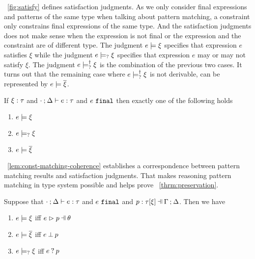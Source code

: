 \documentclass[runningheads,envcountsame,a4paper]{llncs}
\begin{document}


\figurename~\ref{fig:satisfy} defines satisfaction judgments. As we only
consider final expressions and patterns of the same type when talking about
pattern matching, a constraint only constrains final expressions of the same
type. And the satisfaction judgments does not make sense when the expression is
not final or the expression and the constraint are of different type. The
judgment $e \models \xi$ specifies that expression $e$ satisfies $\xi$ while
the judgment $e \models_{?} \xi$ specifies that expression $e$ may or may not
satisfy $\xi$. The judgment $e \models_{?}^{\dag} \xi$ is the combination of the
previous two cases. It turns out that the remaining case where
$e \models_{?}^{\dag} \xi$ is not derivable, can be represented by
$e \models \overline{\xi}$.

\begin{theorem}
  \label{thrm:exclusive-constraint-satisfaction}
  If $\xi : \tau$ and $\cdot \mathbin{;} \Delta \vdash e : \tau$ and $e ~\mathtt{final}$ then exactly one of the following holds
  \begin{enumerate}
  \item $e \models \xi$
  \item $e \models_{?} \xi$
  \item $e \models \overline{\xi}$
  \end{enumerate}
\end{theorem}

\lemmaname~\ref{lem:const-matching-coherence} establishes a correspondence
between pattern matching results and satisfaction judgments. That makes
reasoning pattern matching in type system possible and helps prove
\theoremname~\ref{thrm:preservation}.

\begin{lemma}
  \label{lem:const-matching-coherence}
  Suppose that $\cdot \mathbin{;} \Delta \vdash e : \tau$ and $e ~\mathtt{final}$ and $\chpattyp{p}{\tau}{\xi}{\Gamma}{\Delta}$. Then we have
  \begin{enumerate}
  \item $e \models \xi$ iff $\hpatmatch{e}{p}{\theta}$
  \item $e \models \overline{\xi}$ iff $e \mathbin{\bot} p$
  \item $e \models_{?} \xi$ iff $e \mathbin{?} p$
  \end{enumerate}
\end{lemma}
\end{document}
